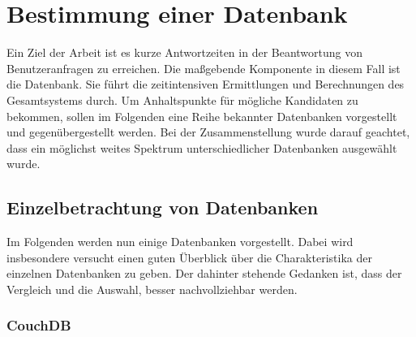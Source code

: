 \chapter{Bestimmung einer Datenbank}
\label{ch:AnalyseDatenbanken}

Ein Ziel der Arbeit ist es kurze Antwortzeiten in der Beantwortung von Benutzeranfragen zu erreichen. Die maßgebende Komponente in diesem Fall ist die Datenbank. Sie führt die zeitintensiven Ermittlungen und Berechnungen  des Gesamtsystems durch. Um Anhaltspunkte für mögliche Kandidaten zu bekommen, sollen im Folgenden eine Reihe bekannter Datenbanken vorgestellt und gegenübergestellt werden. Bei der Zusammenstellung wurde darauf geachtet, dass ein möglichst weites Spektrum unterschiedlicher Datenbanken ausgewählt wurde.

\section{Einzelbetrachtung von Datenbanken}
\label{ch:AnalyseDatenbanken:sec:Datenbanken}

Im Folgenden werden nun einige Datenbanken vorgestellt. Dabei wird insbesondere versucht einen guten Überblick über die Charakteristika der einzelnen Datenbanken zu geben. Der dahinter stehende Gedanken ist, dass der Vergleich und die Auswahl, besser nachvollziehbar werden. 

\subsection{CouchDB}
\label{ch:AnalyseDatenbanken:sec:Datenbanken:subsec:CouchDB}

